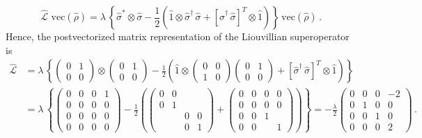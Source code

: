 \documentclass[11pt]{article}
\numberwithin{equation}{section} %
\numberwithin{figure}{section} %
\begin{document}
\begin{appendices}
\begin{equation}
\hat{\mathcal{L}}\,\,\textrm{vec}(\hat{\rho}) =  \lambda\, \left\lbrace  \hat{\sigma}^*\otimes\hat{\sigma} -\frac{1}{2}\left(\hat{1}\otimes\hat{\sigma}^\dagger\,\hat{\sigma} + [\hat{\sigma}^\dagger\,\hat{\sigma}]^T\otimes\hat{1}  \right) \right\rbrace\,\textrm{vec}(\hat{\rho})\,\textrm{.}
\end{equation}
Hence, the postvectorized matrix representation of the Liouvillian superoperator is
\begin{equation} \label{Liouvillian_matrix}
\begin{split}
\hat{\mathcal{L}}
&=  \lambda\, \left\lbrace \begin{pmatrix}0&1\\0&0\end{pmatrix}\otimes \begin{pmatrix}0&1\\0&0\end{pmatrix}  -\frac{1}{2}\left(\hat{1}\otimes\begin{pmatrix}0&0\\1&0\end{pmatrix}\begin{pmatrix}0&1\\0&0\end{pmatrix} + [\hat{\sigma}^\dagger\,\hat{\sigma}]^T\otimes\hat{1}  \right) \right\rbrace\\
&= \lambda\, \left\lbrace \begin{pmatrix}0&0&0&1\\0&0&0&0\\0&0&0&0\\0&0&0&0\end{pmatrix} -\frac{1}{2} \left( \begin{pmatrix}0&0&&\\0&1&&\\&&0&0\\&&0&1\end{pmatrix} + \begin{pmatrix}0&0&0&0\\0&0&0&0\\0&0&1&\\0&0&&1\end{pmatrix}\right) \right\rbrace = -\frac{\lambda}{2} \begin{pmatrix}0&0&0&-2\\0&1&0&0\\0&0&1&0\\0&0&0&2
\end{pmatrix}\,\textrm{.}
\end{split}
\end{equation}

\end{appendices}
\end{document}
